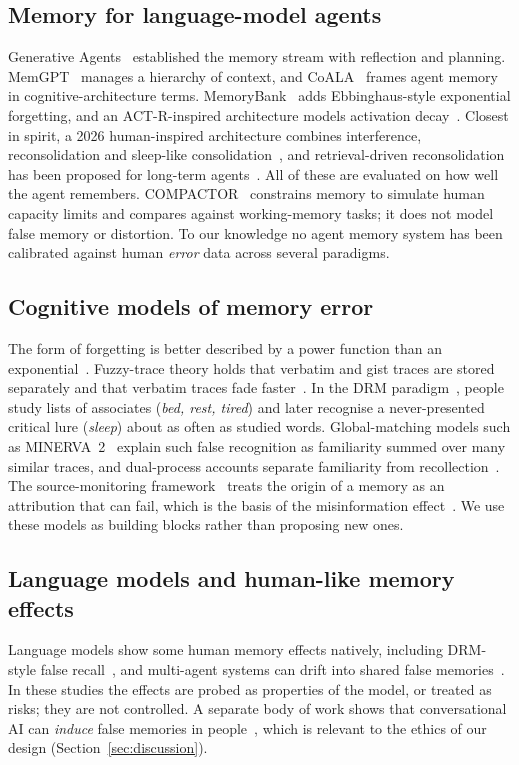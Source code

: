 \documentclass[conference]{IEEEtran}
\begin{document}
\subsection{Memory for language-model agents}
Generative Agents~\cite{park2023generative} established the memory stream with reflection and
planning. MemGPT~\cite{packer2023memgpt} manages a hierarchy of context, and CoALA~\cite{sumers2023coala}
frames agent memory in cognitive-architecture terms. MemoryBank~\cite{zhong2024memorybank} adds
Ebbinghaus-style exponential forgetting, and an ACT-R-inspired architecture models activation
decay~\cite{actr2025}. Closest in spirit, a 2026 human-inspired architecture combines interference,
reconsolidation and sleep-like consolidation~\cite{humaninspired2026}, and retrieval-driven
reconsolidation has been proposed for long-term agents~\cite{reconsolidation2026}. All of these are
evaluated on how well the agent remembers. COMPACTOR~\cite{compactor2026} constrains memory to
simulate human capacity limits and compares against working-memory tasks; it does not model false
memory or distortion. To our knowledge no agent memory system has been calibrated against human
\emph{error} data across several paradigms.

\subsection{Cognitive models of memory error}
The form of forgetting is better described by a power function than an
exponential~\cite{wixted1991}. Fuzzy-trace theory holds that verbatim and gist traces are stored
separately and that verbatim traces fade faster~\cite{brainerd2002fuzzy}. In the DRM
paradigm~\cite{deese1959,roediger1995}, people study lists of associates (\emph{bed, rest, tired})
and later recognise a never-presented critical lure (\emph{sleep}) about as often as studied words.
Global-matching models such as MINERVA~2~\cite{hintzman1988} explain such false recognition as
familiarity summed over many similar traces, and dual-process accounts separate familiarity from
recollection~\cite{yonelinas2002}. The source-monitoring framework~\cite{johnson1993} treats the
origin of a memory as an attribution that can fail, which is the basis of the misinformation
effect~\cite{loftus1974,loftus1978}. We use these models as building blocks rather than proposing
new ones.

\subsection{Language models and human-like memory effects}
Language models show some human memory effects natively, including DRM-style false
recall~\cite{llmmemoryeffects2025,geometry2026}, and multi-agent systems can drift into shared false
memories~\cite{manbench2026}. In these studies the effects are probed as properties of the model, or
treated as risks; they are not controlled. A separate body of work shows that conversational AI can
\emph{induce} false memories in people~\cite{chan2024falsememories}, which is relevant to the ethics
of our design (Section~\ref{sec:discussion}).
\end{document}
